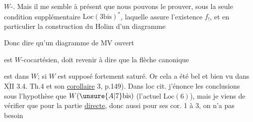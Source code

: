 
 $W$-.  Mais il me semble à présent que nous pouvons le prouver,  sous la seule condition supplémentaire  $\mathrm{Loc}(3\mathrm{bis})^{*}$,
laquelle assure l'existence  $f_!$, et en particulier la construction du  $\mathrm{Holim}$ d'un diagramme

Donc dire qu'un diagramme de MV ouvert

est $W$-cocartésien, doit revenir à dire que la flèche canonique

est dans $W$;   si $W$ est supposé fortement saturé. Or cela a été bel et bien vu dans $\underline{\overline{\mathrm{XII}}}$ 3.4. Th.4 et son \uline{corollaire} 3, p.149). Dans loc cit. j'énonce les conclusions sous l'hypothèse que  $W(\unsure{A|7}\mathrm{bis})$ (l'actuel $\mathrm{Loc}(6)$), mais je viens de vérifier que pour la partie \uline{directe}, donc aussi pour ses cor. 1 à 3, on n'a pas besoin
